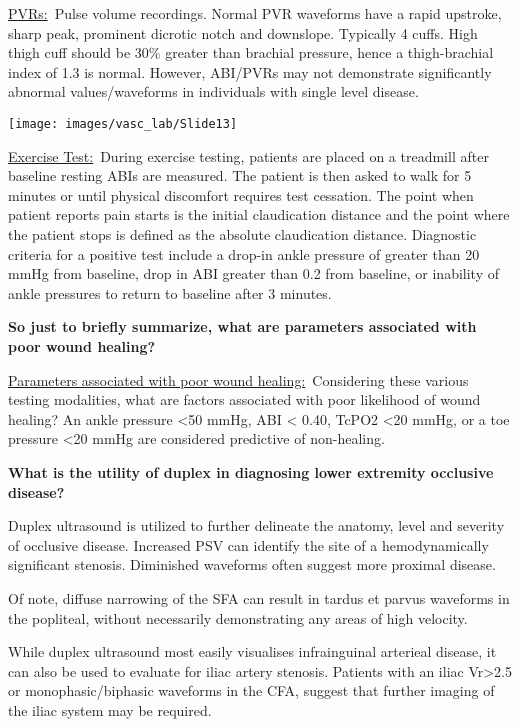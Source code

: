 \documentclass[
]{book}
\begin{document}
\uline{PVRs:}~Pulse volume recordings. Normal PVR waveforms have a
rapid upstroke, sharp peak, prominent dicrotic notch and downslope.
Typically 4 cuffs. High thigh cuff should be 30\% greater than brachial
pressure, hence a thigh-brachial index of 1.3 is normal. However,
ABI/PVRs may not demonstrate significantly abnormal values/waveforms in
individuals with single level disease.

\texttt{[image: images/vasc\_lab/Slide13]}

\uline{Exercise Test:}~During exercise testing, patients are
placed on a treadmill after baseline resting ABIs are measured. The
patient is then asked to walk for 5 minutes or until physical discomfort
requires test cessation. The point when patient reports pain starts is
the initial claudication distance and the point where the patient stops
is defined as the absolute claudication distance. Diagnostic criteria
for a positive test include a drop-in ankle pressure of greater than 20
mmHg from baseline, drop in ABI greater than 0.2 from baseline, or
inability of ankle pressures to return to baseline after 3
minutes.\citep{strandness1964}

\textbf{So just to briefly summarize, what are parameters associated with poor
wound healing?}

\uline{Parameters associated with poor wound healing:}~Considering
these various testing modalities, what are factors associated with poor
likelihood of wound healing? An ankle pressure \textless50 mmHg, ABI \textless{} 0.40,
TcPO2 \textless20 mmHg, or a toe pressure \textless20 mmHg are considered predictive
of non-healing.

\textbf{What is the utility of duplex in diagnosing lower extremity occlusive
disease?}

Duplex ultrasound is utilized to further delineate the anatomy, level
and severity of occlusive disease. Increased PSV can identify the site
of a hemodynamically significant stenosis. Diminished waveforms often
suggest more proximal disease.

Of note, diffuse narrowing of the SFA can result in tardus et parvus
waveforms in the popliteal, without necessarily demonstrating any areas
of high velocity.\citep{aburahma2022, pellerito2019}

While duplex ultrasound most easily visualises infrainguinal arterieal
disease, it can also be used to evaluate for iliac artery stenosis.
Patients with an iliac Vr\textgreater2.5 or monophasic/biphasic waveforms in the
CFA, suggest that further imaging of the iliac system may be
required.\citep{heinen2018}
\end{document}
